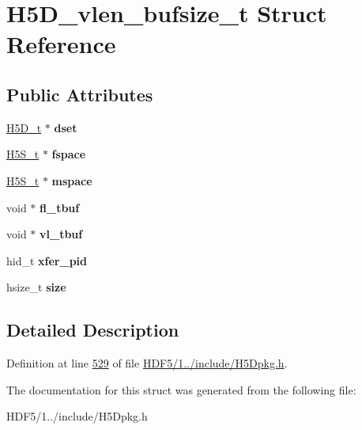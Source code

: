 \hypertarget{struct_h5_d__vlen__bufsize__t}{}\section{H5\+D\+\_\+vlen\+\_\+bufsize\+\_\+t Struct Reference}
\label{struct_h5_d__vlen__bufsize__t}
\subsection*{Public Attributes}
\begin{DoxyCompactItemize}
\item 
\mbox{\label{struct_h5_d__vlen__bufsize__t_a014f84553aa6005266439d30f15c0e5b}} 
\hyperlink{struct_h5_d__t}{H5\+D\+\_\+t} $\ast$ {\bfseries dset}
\item 
\mbox{\label{struct_h5_d__vlen__bufsize__t_a804918f6eaa1ae64d5191dcb596e0b67}} 
\hyperlink{struct_h5_s__t}{H5\+S\+\_\+t} $\ast$ {\bfseries fspace}
\item 
\mbox{\label{struct_h5_d__vlen__bufsize__t_a0d82ba8e3df9e92202e63580d6f91ae4}} 
\hyperlink{struct_h5_s__t}{H5\+S\+\_\+t} $\ast$ {\bfseries mspace}
\item 
\mbox{\label{struct_h5_d__vlen__bufsize__t_a6f66dd39e3889f05f9a34ff83474f800}} 
void $\ast$ {\bfseries fl\+\_\+tbuf}
\item 
\mbox{\label{struct_h5_d__vlen__bufsize__t_a82a46e4fa2d54d6d42c863e70fe3bd9c}} 
void $\ast$ {\bfseries vl\+\_\+tbuf}
\item 
\mbox{\label{struct_h5_d__vlen__bufsize__t_af3fc6c508a67b10fd3fa038155f20264}} 
hid\+\_\+t {\bfseries xfer\+\_\+pid}
\item 
\mbox{\label{struct_h5_d__vlen__bufsize__t_a06e744c9a698e25c54345dafbd35694b}} 
hsize\+\_\+t {\bfseries size}
\end{DoxyCompactItemize}


\subsection{Detailed Description}


Definition at line \hyperlink{_h_d_f5_21_810_81_2include_2_h5_dpkg_8h_source_l00529}{529} of file \hyperlink{_h_d_f5_21_810_81_2include_2_h5_dpkg_8h_source}{H\+D\+F5/1../include/\+H5\+Dpkg.\+h}.



The documentation for this struct was generated from the following file\+:\begin{DoxyCompactItemize}
\item 
H\+D\+F5/1../include/\+H5\+Dpkg.\+h\end{DoxyCompactItemize}

